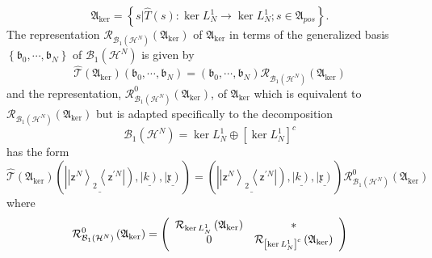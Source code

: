 \documentclass[aps,preprint]{revtex4}%
\begin{document}
\begin{equation}
\mathfrak{A}_{\ker}=\left\{  s|\hat{T}\left(  s\right)  :\ker L_{N}%
^{1}\rightarrow\ker L_{N}^{1};s\in\mathfrak{A}_{pos}\right\}  .
\end{equation}
The representation $\mathcal{R}_{\mathcal{B}_{1}\left(  \mathcal{H}%
^{N}\right)  }\left(  \mathfrak{A}_{\ker}\right)  $ of $\mathfrak{A}_{\ker}$
in terms of the generalized basis $\left\{  \mathfrak{b}_{0},\cdots
,\mathfrak{b}_{N}\right\}  $ of $\mathcal{B}_{1}\left(  \mathcal{H}%
^{N}\right)  $ is given by
\begin{equation}
\mathcal{\hat{T}}\left(  \mathfrak{A}_{\ker}\right)  \left(  \mathfrak{b}%
_{0},\cdots,\mathfrak{b}_{N}\right)  =\left(  \mathfrak{b}_{0},\cdots
,\mathfrak{b}_{N}\right)  \mathcal{R}_{\mathcal{B}_{1}\left(  \mathcal{H}%
^{N}\right)  }\left(  \mathfrak{A}_{\ker}\right)
\end{equation}
and the representation, $\mathcal{R}_{\mathcal{B}_{1}\left(  \mathcal{H}%
^{N}\right)  }^{0}\left(  \mathfrak{A}_{\ker}\right)  $, of $\mathfrak{A}%
_{\ker}$ which is equivalent to $\mathcal{R}_{\mathcal{B}_{1}\left(
\mathcal{H}^{N}\right)  }\left(  \mathfrak{A}_{\ker}\right)  $ but is adapted
specifically to the decomposition
\begin{equation}
\mathcal{B}_{1}\left(  \mathcal{H}^{N}\right)  =\ker L_{N}^{1}\oplus\left[
\ker L_{N}^{1}\right]  ^{c}%
\end{equation}
has the form%
\begin{equation}
\mathcal{\hat{T}}\left(  \mathfrak{A}_{\ker}\right)  \left(  \underline
{\left\vert \left\vert \mathsf{z}^{N}\right\rangle _{2}\left\langle
\mathsf{z}^{\prime N}\right\vert \right)  },\underline{\left\vert k\right)
},\underline{\left\vert \mathfrak{x}\right)  }\right)  =\left(  \underline
{\left\vert \left\vert \mathsf{z}^{N}\right\rangle _{2}\left\langle
\mathsf{z}^{\prime N}\right\vert \right)  },\underline{\left\vert k\right)
},\underline{\left\vert \mathfrak{x}\right)  }\right)  \mathcal{R}%
_{\mathcal{B}_{1}\left(  \mathcal{H}^{N}\right)  }^{0}\left(  \mathfrak{A}%
_{\ker}\right)
\end{equation}
where
\begin{equation}
\mathcal{R}_{\mathcal{B}_{1}\left(  \mathcal{H}^{N}\right)  }^{0}\left(
\mathfrak{A}_{\ker}\right)  =\left(
\begin{array}
[c]{cc}%
\mathcal{R}_{\ker L_{N}^{1}}\left(  \mathfrak{A}_{\ker}\right)  & \ast\\
0 & \mathcal{R}_{\left[  \ker L_{N}^{1}\right]  ^{c}}\left(  \mathfrak{A}%
_{\ker}\right)
\end{array}
\right)  \label{K0}%
\end{equation}
\end{document}
